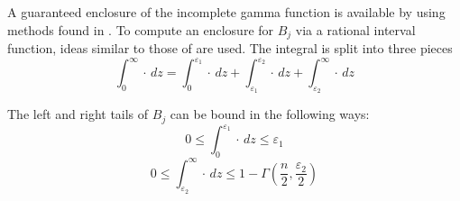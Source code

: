 A guaranteed enclosure of the incomplete gamma function is available by using
methods found in \cite{WangKennedyJASA}.
To compute an enclosure for $B_j$ via a rational interval function,
 ideas similar to those of
\cite{AmosBulgren} are used.  The integral is split into three pieces
\begin{equation}
  \int_0^\infty \cdot \, dz = \int_0^{\varepsilon _1} \cdot \, dz 
    + \int_{\varepsilon _1}^{\varepsilon _2} \cdot \, dz 
    + \int_{\varepsilon _2}^\infty \cdot \, dz
   \label{three:integral}
\end{equation}

The left and right tails of $B_j$ can be bound in the following ways:
$$
0 \leq \int_0^{\varepsilon _1} \cdot \, dz \leq \varepsilon _1 
\nonumber
$$
$$
0 \leq \int_{\varepsilon _2}^\infty \cdot \, dz 
  \leq 1 - \Gamma\left(\frac{n}{2}, \frac{\varepsilon _2}{2}\right)
$$

